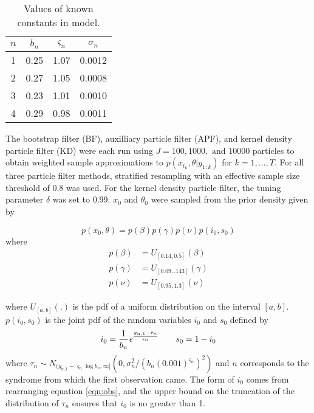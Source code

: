 \documentclass{article}
\begin{document}
\begin{table}[ht]
\begin{center}
\caption{Values of known constants in model.}
\label{tab:true}
\begin{tabular}{|cccc|}
\hline
$n$ & $b_n$ & $\varsigma_n$ & $\sigma_n$ \\
\hline
1 & 0.25 & 1.07 & 0.0012 \\
2 & 0.27 & 1.05 & 0.0008 \\
3 & 0.23 & 1.01 & 0.0010 \\
4 & 0.29 & 0.98 & 0.0011 \\
\hline
\end{tabular}
\end{center}
\end{table}

The bootstrap filter (BF), auxilliary particle filter (APF), and kernel density particle filter (KD) were each run using $J = 100, 1000, \mbox{ and } 10000$ particles to obtain weighted sample approximations to $p(x_{t_k},\theta|y_{1:k})$ for $k = 1,\ldots,T$.  For all three particle filter methods, stratified resampling with an effective sample size threshold of 0.8 was used.  For the kernel density particle filter, the tuning parameter $\delta$ was set to 0.99. $x_0$ and $\theta_0$ were sampled from the prior density given by

\[p\left(x_0,\theta\right) = p\left(\beta\right)p\left(\gamma\right)p\left(\nu\right)p\left(i_0,s_0\right)\] where
\begin{align*}
p(\beta) &= U_{[0.14,0.5]}(\beta) \\
p(\gamma) &= U_{[0.09,.143]}(\gamma) \\
p(\nu) &= U_{[0.95,1.3]}(\nu)
\end{align*}

\noindent where $U_{[a,b]}(.)$ is the pdf of a uniform distribution on the interval $[a,b]$.  $p(i_0,s_0)$ is the joint pdf of the random variables $i_0$ and $s_0$ defined by
\[i_0 = \frac{1}{b_n} \emph{e}^{\frac{y_{n,1}-\tau_n}{\varsigma_n}} \qquad s_0 = 1 - i_0 \]
where $\tau_n \sim N_{(y_{n,1} - \varsigma_n \log b_n,\infty]}(0,\sigma_n^2 / (b_n(0.001)^{\varsigma_n})^2)$ and $n$ corresponds to the syndrome from which the first observation came.  The form of $i_0$ comes from rearranging equation \eqref{eqn:obs}, and the upper bound on the truncation of the distribution of $\tau_n$ ensures that $i_0$ is no greater than 1.
\end{document}
